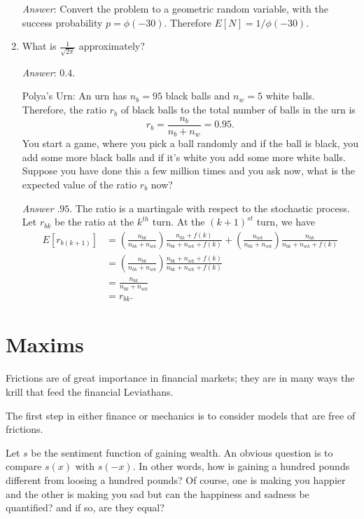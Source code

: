 \documentclass{amsart}
\theoremstyle{plain}
\numberwithin{equation}{section}
\begin{document}
\begin{enumerate}
\emph{Answer}: Convert the problem to 
a geometric random variable, with the 
success probability $p = \phi(-30)$. 
Therefore $E[N] = 1/\phi(-30)$. 

\item What is $\frac{1}{\sqrt{2\pi}}$ approximately?

\emph{Answer}: $0.4$.

Polya's Urn: An urn has $n_b=95$ black balls
and $n_w=5$ white balls. Therefore, the ratio 
$r_b$ of black balls to the total number of 
balls in the urn is 
\begin{equation}
r_b = \frac{n_b}{n_b + n_w} = 0.95.
\end{equation}
You start a game, where 
you pick a ball randomly and if the ball
is black, you 
add some more black balls and if it's white you 
add some more white balls. Suppose you have 
done this a few million times and you ask 
now, what is the expected value of the 
ratio $r_b$ now?

\emph{Answer} $.95$. The ratio is a martingale with 
respect to the stochastic process.
Let $r_{bk}$ be the ratio at the $k^{th}$ 
turn. At the $(k+1)^{st}$ turn, we have 
\begin{align}
E[ r_{b(k+1)} ] &= 
\left( \frac{n_{bk}}{n_{bk} + n_{wk}} \right)
\frac{n_{bk} + f(k)}{n_{bk} + n_{wk} + f(k)} +
\left( \frac{n_{wk}}{n_{bk} + n_{wk}} \right)
\frac{n_{bk}}{n_{bk} + n_{wk} + f(k)}\\
&= \left( \frac{n_{bk}}{n_{bk} + n_{wk}} \right)
\frac{n_{bk} + n_{wk} + f(k) }{n_{bk} + n_{wk} + f(k)}\\
&= \frac{n_{bk}}{n_{bk} + n_{wk}}\\
&= r_{bk}.
\end{align}


\end{enumerate}


\section*{Maxims}
Frictions are of great importance in financial markets;
they are in many ways the krill that feed the financial 
Leviathans.

The first step in either finance or mechanics is to 
consider models that are free of frictions. 

Let $s$ be the sentiment function of 
gaining wealth. An obvious question is
to compare $s(x)$ with $s(-x)$. In other words,
how is gaining a hundred pounds different from 
loosing a hundred pounds? Of course, one is making 
you happier and the other is making you sad but 
can the happiness and sadness be quantified? and 
if so, are they equal?
\end{document}
